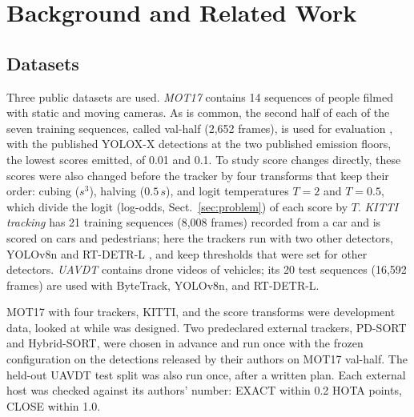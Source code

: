 \section{Background and Related Work}\label{sec:related}

\subsection{Datasets}\label{sec:data}
Three public datasets are used. \emph{MOT17} \cite{milan2016mot16} contains 14 sequences of
people filmed with static and moving cameras. As is common, the second half of each of the seven
training sequences, called val-half (2,652 frames), is used for evaluation \cite{zhang2022bytetrack},
with the published YOLOX-X detections \cite{ge2021yolox} at the two published emission floors, the
lowest scores emitted, of 0.01 and 0.1. To study score changes directly, these scores were also
changed before the tracker by four transforms that keep their order: cubing ($s^3$), halving
($0.5\,s$), and logit temperatures $T=2$ and $T=0.5$, which divide the logit (log-odds, Sect.~\ref{sec:problem}) of each score by $T$.
\emph{KITTI tracking} \cite{geiger2012kitti} has 21 training sequences (8,008 frames) recorded from
a car and is scored on cars and pedestrians; here the trackers run with two other detectors,
YOLOv8n \cite{jocher2023yolov8} and RT-DETR-L \cite{zhao2024rtdetr}, and keep thresholds that were
set for other detectors. \emph{UAVDT} \cite{du2018uavdt} contains drone videos of vehicles; its 20
test sequences (16,592 frames) are used with ByteTrack, YOLOv8n, and RT-DETR-L.

MOT17 with four trackers, KITTI, and the score transforms were development data, looked at while
\scl{} was designed. Two predeclared external trackers, PD-SORT and Hybrid-SORT, were chosen in
advance and run once with the frozen configuration on the detections released by their authors on
MOT17 val-half. The held-out UAVDT test split was also run once, after a written plan. Each
external host was checked against its authors' number: EXACT within 0.2 HOTA points, CLOSE within
1.0.

